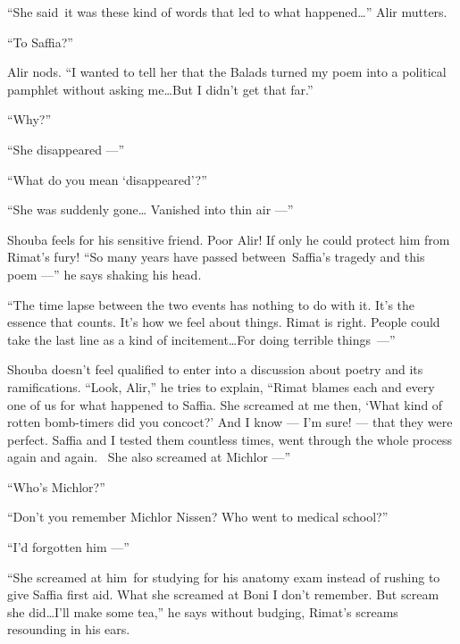 \documentclass[twoside,11pt]{book}
\begin{document}
``She said~it was these kind of words that led to what happened{\ldots}'' Alir mutters.

``To Saffia?''

Alir nods. ``I wanted to tell her that the Balads turned my poem into a political pamphlet without asking
me{\ldots}But I didn't get that far.''

``Why?''

``She disappeared ---''

``What do you mean `disappeared'?''

``She was suddenly gone{\ldots} Vanished into thin air ---''

Shouba feels for his sensitive friend. Poor Alir! If only he could protect him from Rimat's fury! ``So many
years have passed between~Saffia's tragedy and this poem ---'' he says shaking his head.

``The time lapse between the two events has nothing to do with it. It's the essence that counts. It's how
we feel about things. Rimat is right. People could take the last line as a kind of incitement{\ldots}For doing terrible
things~---''

Shouba doesn't feel qualified to enter into a discussion about poetry and its{ }ramifications.  ``Look,
Alir,'' he tries to explain, ``Rimat blames each and every one of us for what happened to
Saffia. She screamed at me then, `What kind of rotten bomb-timers did you concoct?' And I know --- I'm sure! --- that they
were perfect. Saffia and I tested them countless times, went through the whole process again and again. ~She also
screamed at Michlor ---''

``Who's Michlor?''

``Don't you remember Michlor Nissen? Who went to medical school?''

``I'd forgotten him ---''

``She screamed at him~for studying for his anatomy exam instead of rushing to give Saffia first aid. What
she screamed at Boni I don't remember. But scream she did{\ldots}I'll make some tea,'' he says without
budging, Rimat's screams resounding in his ears.
\end{document}
